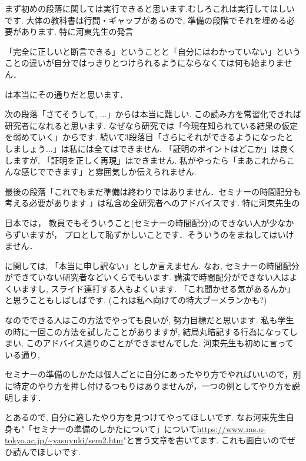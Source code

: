 まず初めの段落に関しては実行できると思います.むしろこれは実行してほしいです. 
大体の教科書は行間・ギャップがあるので, 準備の段階でそれを埋める必要があります. 
特に河東先生の発言
\begin{tcolorbox}[mybox]
「完全に正しいと断言できる」ということと「自分にはわかっていない」ということの違いが自分ではっきりとつけられるようにならなくては何も始まりません．
\end{tcolorbox}
は本当にその通りだと思います．

次の段落「さてそうして, ...」からは本当に難しい. この読み方を常習化できれば研究者になれると思います. 
なぜなら研究では「今現在知られている結果の仮定を弱めていく」からです. 
続いて3段落目「さらにそれができるようになったとしましょう...」は私には全てはできません. 「証明のポイントはどこか」は良くしますが, 「証明を正しく再現」はできません. 私がやったら「まあこれからこんな感じでできます」と雰囲気しか伝えられません.  

最後の段落「これでもまだ準備は終わりではありません．セミナーの時間配分も考える必要があります.」は私含め全研究者へのアドバイスです. 
特に河東先生の
\begin{tcolorbox}[mybox]
日本では， 教員でもそういうこと(セミナーの時間配分)のできない人が少なからずいますが， プロとして恥ずかしいことです．そういうのをまねしてはいけません．
\end{tcolorbox}
に関しては, 「本当に申し訳ない」としか言えません. 
なお, セミナーの時間配分ができていない研究者などいくらでもいます. 
講演で時間配分ができない人はよくいますし, スライド連打する人もよくいます. 
「これ聞かせる気があるんか」と思うこともしばしばです. (これは私へ向けての特大ブーメランかも?)

なのでできる人はこの方法でやっても良いが, 努力目標だと思います.
私も学生の時に一回この方法を試したことがありますが, 結局丸暗記する行為になってしまい, このアドバイス通りのことができませんでした. 
河東先生も初めに言っている通り, 
\begin{tcolorbox}[mybox]
セミナーの準備のしかたは個人ごとに自分にあったやり方でやればいいので，別に特定のやり方を押し付けるつもりはありませんが，一つの例としてやり方を説明します．
\end{tcolorbox}
とあるので, 自分に適したやり方を見つけてやってほしいです. なお河東先生自身も"「セミナーの準備のしかたについて」について\url{https://www.ms.u-tokyo.ac.jp/~yasuyuki/sem2.htm}"と言う文章を書いてます. これも面白いのでぜひ読んでほしいです. 

